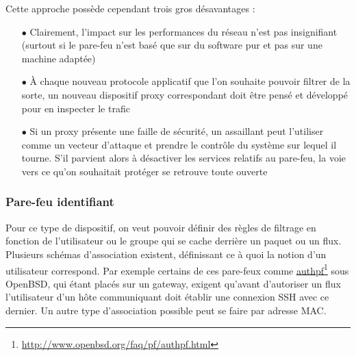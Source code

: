 \documentclass[]{article}
\begin{document}
\par Cette approche possède cependant trois gros désavantages : 
\begin{itemize}
\vspace{0.2cm}
\item[$\bullet$] Clairement, l'impact sur les performances du réseau n'est pas insignifiant (surtout si le pare-feu n'est basé que sur du software pur et pas sur une machine adaptée)
\vspace{0.2cm}
\item[$\bullet$] À chaque nouveau protocole applicatif que l'on souhaite pouvoir filtrer de la sorte, un nouveau dispositif proxy correspondant doit être pensé et développé pour en inspecter le trafic
\vspace{0.2cm}
\item[$\bullet$] Si un proxy présente une faille de sécurité, un assaillant peut l'utiliser comme un vecteur d'attaque et prendre le contrôle du système sur lequel il tourne. S'il parvient alors à désactiver les services relatifs au pare-feu, la voie vers ce qu'on souhaitait protéger se retrouve toute ouverte
\end{itemize}


\subsubsection{Pare-feu identifiant}\label{idfw}

Pour ce type de dispositif, on veut pouvoir définir des règles de filtrage en fonction de l'utilisateur ou le groupe qui se cache derrière un paquet ou un flux. Plusieurs schémas d'association existent, définissant ce à quoi la notion d'un utilisateur correspond. Par exemple certains de ces pare-feux comme \href{http://www.openbsd.org/faq/pf/authpf.html}{authpf}\footnote{\url{http://www.openbsd.org/faq/pf/authpf.html}} sous OpenBSD, qui étant placés sur un gateway, exigent qu'avant d'autoriser un flux l'utilisateur d'un hôte communiquant doit établir une connexion SSH avec ce dernier. Un autre type d'association possible peut se faire par adresse MAC.\\
\end{document}
